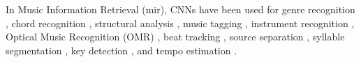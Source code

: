 In Music Information Retrieval (\gls{mir}), CNNs have been used
for genre recognition \parencite{dieleman2011audiobased},
chord recognition \parencite{humphrey2012rethinking},
structural analysis \parencite{ullrich2014boundary,
grill2015music}, music tagging
\parencite{choi2016automatic}, instrument recognition
\parencite{lostanlen2016deep}, Optical Music Recognition
(OMR) \parencite{calvozaragoza2017endend, pacha2018optical},
beat tracking \parencite{gkiokas2017convolutional}, source
separation \parencite{miron2017monaural}, syllable
segmentation \parencite{pons2017scoreinformed}, key
detection \parencite{korzeniowski2018genreagnostic}, and
tempo estimation \parencite{schreiber2018singlestep,
schreiber2019musical}.
